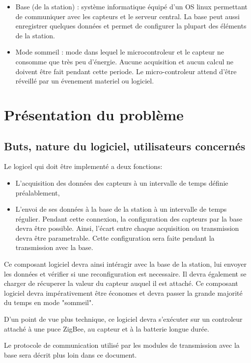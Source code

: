 \begin{itemize}
\item Base (de la station) : système informatique équipé d'un OS linux permettant de communiquer avec les capteurs et le serveur central. La base peut aussi enregistrer quelques données et permet de configurer la plupart des éléments de la station.
\item Mode sommeil : mode dans lequel le microcontroleur et le capteur ne consomme que très peu d'énergie. Aucune acquisition et aucun calcul ne doivent être fait pendant cette periode. Le micro-controleur attend d'être réveillé par un évenement materiel ou logiciel.
\end{itemize}

\section{Présentation du problème}

\subsection{Buts, nature du logiciel, utilisateurs concernés}

Le logicel qui doit être implementé a deux fonctions:
\begin{itemize}
\item L'acquisition des données des capteurs à un intervalle de temps définie préalablement,
\item L'envoi de ses données à la base de la station à un intervalle de temps régulier. Pendant cette connexion, la configuration des capteurs par la base devra être possible. Ainsi, l'écart entre chaque acquisition ou transmission devra être parametrable. Cette configuration sera faite pendant la transmission avec la base.
\end{itemize}

Ce composant logiciel devra ainsi intéragir avec la base de la station, lui envoyer les données et vérifier si une reconfiguration est necessaire. Il devra également se charger de récuperer la valeur du capteur auquel il est attaché. Ce composant logiciel devra impérativement être économes et devra passer la grande majorité du temps en mode "sommeil".

D'un point de vue plus technique, ce logiciel devra s'exécuter sur un controleur attaché à une puce ZigBee, au capteur et à la batterie longue durée.

Le protocole de communication utilisé par les modules de transmission avec la base sera décrit plus loin dans ce document.

